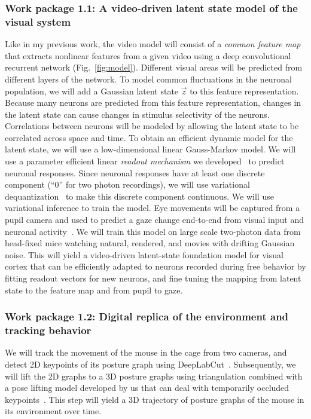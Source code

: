 \documentclass[B2,COG]{ercgrant}
\begin{document}
\subsubsection{Work package 1.1: A video-driven latent state model of the visual system\hfill{}}
Like in my previous work, the video model will consist of a \textit{common feature map} that extracts nonlinear features from a given video using a deep convolutional recurrent network (Fig.~\ref{fig:model}).
Different visual areas will be predicted  from different layers of the network.
To model common fluctuations in the neuronal population, we will add a Gaussian latent state $\vec{z}$ to this feature representation.
Because many neurons are predicted from this feature representation, changes in the latent state can cause changes in stimulus selectivity of the neurons.
Correlations between neurons will be modeled by allowing the latent state to be correlated across space and time. 
To obtain an efficient dynamic model for the latent state, we will use a low-dimensional linear Gauss-Markov model.
We will use a parameter efficient linear \textit{readout mechanism} we developed~\parencite{Lurz2020-ua} to predict neuronal responses.
Since neuronal responses have at least one discrete component (``0'' for two photon recordings), we will use variational dequantization~\parencite{Hoogeboom2021-zs} to make this discrete component continuous.
We will use variational inference to train the model. 
Eye movements will be captured from a pupil camera and used to predict a gaze change end-to-end from visual input and neuronal activity~\parencite[Fig.~\ref{fig:videomodel}]{Sinz2018-sk}.
We will train this model on large scale two-photon data from head-fixed mice watching natural, rendered, and  movies with drifting Gaussian noise.
This  will yield a video-driven latent-state foundation model for visual cortex that can be efficiently adapted to neurons recorded during free behavior by fitting readout vectors for new neurons, and fine tuning the mapping from latent state to the feature map and from pupil to gaze.

\subsubsection{Work package 1.2: Digital replica of the environment and tracking behavior\hfill{}}
We will track the movement of the mouse in the cage from two cameras, and detect 2D keypoints of its posture graph using DeepLabCut~\parencite{Mathis2018-lk}. 
Subsequently, we will lift the 2D graphs to a 3D posture graphs using triangulation combined with a pose lifting model developed by us that can deal with temporarily occluded keypoints~\parencite{Pierzchlewicz2022-tq}. 
This step will yield a 3D trajectory of posture graphs  of the mouse in its environment over time. 
\end{document}

